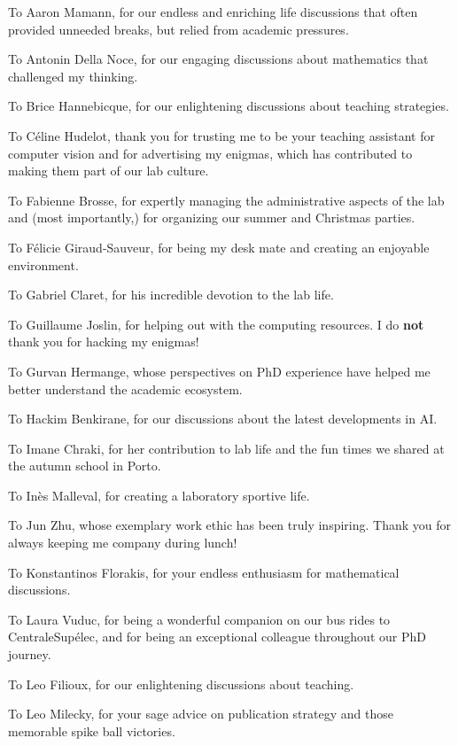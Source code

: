To Aaron Mamann, for our endless and enriching life discussions that often provided unneeded breaks, but relied from academic pressures.


To Antonin Della Noce, for our engaging discussions about mathematics that challenged my thinking.

To Brice Hannebicque, for our enlightening discussions about teaching strategies.

To Céline Hudelot, thank you for trusting me to be your teaching assistant for computer vision and for advertising my enigmas, which has contributed to making them part of our lab culture.

To Fabienne Brosse, for expertly managing the administrative aspects of the lab and (most importantly,) for organizing our summer and Christmas parties.

To Félicie Giraud-Sauveur, for being my desk mate and creating an enjoyable environment.

To Gabriel Claret, for his incredible devotion to the lab life.

To Guillaume Joslin, for helping out with the computing resources.
I do \textbf{not} thank you for hacking my enigmas!

To Gurvan Hermange, whose perspectives on PhD experience have helped me better understand the academic ecosystem.

To Hackim Benkirane, for our discussions about the latest developments in AI.

To Imane Chraki, for her contribution to lab life and the fun times we shared at the autumn school in Porto.

To Inès Malleval, for creating a laboratory sportive life.

To Jun Zhu, whose exemplary work ethic has been truly inspiring.
Thank you for always keeping me company during lunch!

To Konstantinos Florakis, for your endless enthusiasm for mathematical discussions.

To Laura Vuduc, for being a wonderful companion on our bus rides to CentraleSupélec, and for being an exceptional colleague throughout our PhD journey.

To Leo Filioux, for our enlightening discussions about teaching.

To Leo Milecky, for your sage advice on publication strategy and those memorable spike ball victories.

